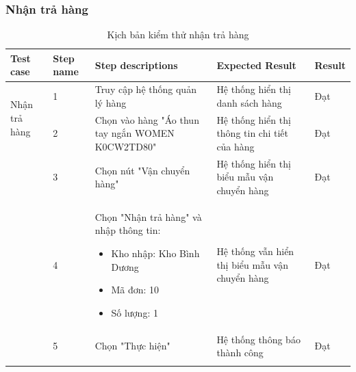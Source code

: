 \subsubsection{Nhận trả hàng}
{
    \setlength\extrarowheight{6pt}
    \begin{longtable}{| p{2.5cm}| p{1cm}| p{5.5cm}| p{4.5cm} | p{1.5cm} |}
        \hline
        \textbf{Test case}                    & \textbf{Step name}                             & \textbf{Step descriptions}                       & \textbf{Expected Result}                      & \textbf{Result} \\
        \hline
        \multirow[t]{2}{2.5cm}{Nhận trả hàng} & 1                                              & Truy cập hệ thống quản lý hàng                   & Hệ thống hiển thị danh sách hàng              & Đạt             \\
        \cline{2-5}
                                              & 2                                              & Chọn vào hàng "Áo thun tay ngắn WOMEN K0CW2TD80" & Hệ thống hiển thị thông tin chi tiết của hàng & Đạt             \\
        \cline{2-5}
                                              & 3                                              & Chọn nút "Vận chuyển hàng"                       & Hệ thống hiển thị biểu mẫu vận chuyển hàng    & Đạt             \\
        \cline{2-5}
                                              & 4                                              & Chọn "Nhận trả hàng" và nhập thông tin:
        \begin{itemize}
            \item Kho nhập: Kho Bình Dương
            \item Mã đơn: 10
            \item Số lượng: 1
        \end{itemize}
                                              & Hệ thống vẫn hiển thị biểu mẫu vận chuyển hàng & Đạt                                                                                                                \\
        \cline{2-5}
                                              & 5                                              & Chọn "Thực hiện"                                 & Hệ thống thông báo thành công                 & Đạt             \\
        \hline
        \caption{Kịch bản kiểm thử nhận trả hàng}
    \end{longtable}
}

